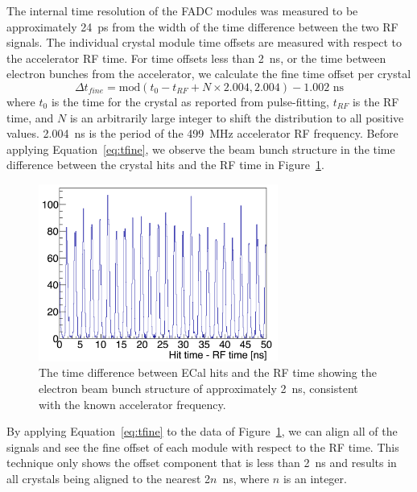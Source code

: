 The internal time resolution of the FADC modules was measured to be approximately 24~ps from the width of the time difference between the two RF signals. The individual crystal module time offsets are measured with respect to the accelerator RF time. For time offsets less than 2~ns, or the time between electron bunches from the accelerator, we calculate the fine time offset per crystal \\

\begin{equation}
	\label{eq:tfine}
	\Delta t_{fine} = \textrm{mod}(t_0 - t_{RF} + N\times 2.004, 2.004) - 1.002 \textrm{ ns}
\end{equation}
where $t_0$ is the time for the crystal as reported from pulse-fitting, $t_{RF}$ is the RF time, and $N$ is an arbitrarily large integer to shift the distribution to all positive values. 2.004~ns is the period of the 499~MHz accelerator RF frequency. Before applying Equation~\eqref{eq:tfine}, we observe the beam bunch structure in the time difference between the crystal hits and the RF time in Figure~\ref{Figure:beamBunch}. 

\begin{figure}[htb]
  \centering
      \includegraphics[width=0.7\textwidth]{pics/performance/beamStructure.png}
  \caption[Time difference between ECal hits and RF time]{The time difference between ECal hits and the RF time showing the electron beam bunch structure of approximately 2~ns, consistent with the known accelerator frequency.}
  \label{Figure:beamBunch}
\end{figure}

By applying Equation~\eqref{eq:tfine} to the data of Figure~\ref{Figure:beamBunch}, we can align all of the signals and see the fine offset of each module with respect to the RF time. This technique only shows the offset component that is less than 2~ns and results in all crystals being aligned to the nearest 2$n$~ns, where $n$ is an integer. 

